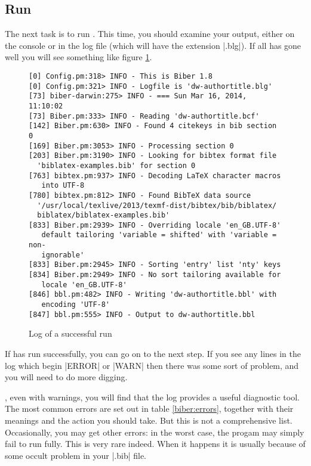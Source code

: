 \subsection{Run }

The next task is to run .  This time, you should
examine your output, either on the console or in the log file (which
will have the extension |.blg|). If all has gone well you will see
something like figure \ref{biber:run}.
\begin{figure}
\begin{Verbatim}[frame=single,fontsize=\small]
[0] Config.pm:318> INFO - This is Biber 1.8
[0] Config.pm:321> INFO - Logfile is 'dw-authortitle.blg'
[73] biber-darwin:275> INFO - === Sun Mar 16, 2014, 11:10:02
[73] Biber.pm:333> INFO - Reading 'dw-authortitle.bcf'
[142] Biber.pm:630> INFO - Found 4 citekeys in bib section 0
[169] Biber.pm:3053> INFO - Processing section 0
[203] Biber.pm:3190> INFO - Looking for bibtex format file 
  'biblatex-examples.bib' for section 0
[763] bibtex.pm:937> INFO - Decoding LaTeX character macros 
   into UTF-8
[780] bibtex.pm:812> INFO - Found BibTeX data source 
  '/usr/local/texlive/2013/texmf-dist/bibtex/bib/biblatex/
  biblatex/biblatex-examples.bib'
[833] Biber.pm:2939> INFO - Overriding locale 'en_GB.UTF-8' 
   default tailoring 'variable = shifted' with 'variable = non-
   ignorable'
[833] Biber.pm:2945> INFO - Sorting 'entry' list 'nty' keys
[834] Biber.pm:2949> INFO - No sort tailoring available for
   locale 'en_GB.UTF-8'
[846] bbl.pm:482> INFO - Writing 'dw-authortitle.bbl' with 
   encoding 'UTF-8'
[847] bbl.pm:555> INFO - Output to dw-authortitle.bbl
\end{Verbatim}
\caption{Log of a successful  run\label{biber:run}}
\end{figure}

If  has run successfully, you can go on to the next
step. If you see any lines in the log which begin |ERROR| or |WARN|
then there was some sort of problem, and you will need to do more
digging.

, even with
warnings, you will find that the log provides a useful diagnostic
tool. The most common errors are set out in table \ref{biber:errors},
together with their meanings and the action you should take. But this
is not a comprehensive list. Occasionally, you may get other errors:
in the worst case, the progam may simply fail to run fully. This is
very rare indeed. When it happens it is usually because of some occult
problem in your |.bib| file.

